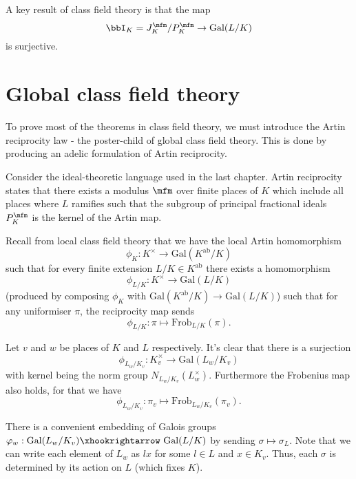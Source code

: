 \documentclass[a4paper, 12pt,oneside,openany]{book}
\begin{document}
A key result of class field theory is that the map $$\bbI_K = J_K^\mfm / P_K^\mfm \to \text{Gal}(L/K)$$ is surjective.


\section{Global class field theory}
To prove most of the theorems in class field theory, we must introduce the Artin reciprocity law - the poster-child of global class field theory. This is done by producing an adelic formulation of Artin reciprocity.

Consider the ideal-theoretic language used in the last chapter. Artin reciprocity states that there exists a modulus $\mfm$ over finite places of $K$ which include all places where $L$ ramifies such that the subgroup of principal fractional ideals $P_K^\mfm$ is the kernel of the Artin map.

Recall from local class field theory that we have the local Artin homomorphism $$\phi_K: K^\times \to \text{Gal}(K^{\text{ab}}/K)$$ such that for every finite extension $L/K\in K^{\text{ab}}$ there exists a homomorphism $$\phi_{L/K}: K^\times \to \text{Gal}(L/K)$$ (produced by composing $\phi_K$ with $\text{Gal}(K^{\text{ab}}/K) \to \text{Gal}(L/K)$) such that for any uniformiser $\pi$, the reciprocity map sends $$\phi_{L/K}: \pi \mapsto \text{Frob}_{L/K}(\pi).$$

Let $v$ and $w$ be places of $K$ and $L$ respectively. It's clear that there is a surjection $$\phi_{L_w/K_v}: K_v^\times \to \text{Gal}(L_w/K_v)$$ with kernel being the norm group $N_{L_w/K_v}(L_w^\times)$. Furthermore the Frobenius map also holds, for that we have $$\phi_{L_w/K_v}: \pi_v \mapsto \text{Frob}_{L_w/K_v}(\pi_v).$$

There is a convenient embedding of Galois groups $\varphi_w: \text{Gal}(L_w/K_v) \xhookrightarrow\ \text{Gal}(L/K)$ by sending $\sigma\mapsto \sigma_L$. Note that we can write each element of $L_w$ as $lx$ for some $l\in L$ and $x \in K_v$. Thus, each $\sigma$ is determined by its action on $L$ (which fixes $K$). 
\end{document}
